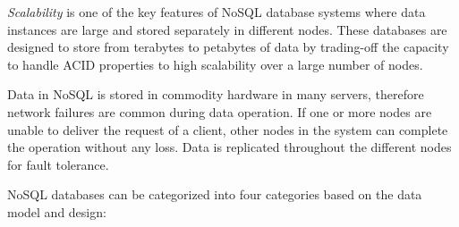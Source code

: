 \documentclass[a4paper,12pt]{book}
\begin{document}
	\textit{Scalability} is one of the key features of NoSQL database systems where data instances are large and stored separately in different nodes. These databases are designed to store from terabytes to petabytes of data by trading-off the capacity to handle ACID properties to high scalability over a large number of nodes\cite{abramova2013nosql}. 	
   \par  Data in NoSQL is stored in commodity hardware in many servers, therefore network failures are common during data operation. If one or more nodes are unable to deliver the request of a client,  other nodes in the system can complete the operation without any loss. Data is replicated throughout the different nodes for fault tolerance.%
    \par 
NoSQL databases can be categorized into four categories based on the data model and design:
\end{document}
